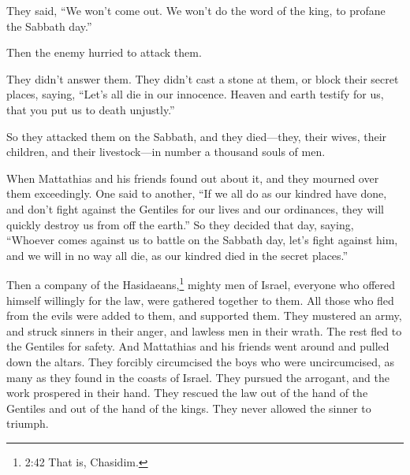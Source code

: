  They said, ``We won't come out. We won't do the word of
the king, to profane the Sabbath day.''

 Then the enemy hurried to attack them.

 They didn't answer them. They didn't cast a stone at them,
or block their secret places,  saying, ``Let's all die in
our innocence. Heaven and earth testify for us, that you put us to death
unjustly.''

 So they attacked them on the Sabbath, and they
died---they, their wives, their children, and their livestock---in
number a thousand souls of men.

 When Mattathias and his friends found out about it, and
they mourned over them exceedingly.  One said to another,
``If we all do as our kindred have done, and don't fight against the
Gentiles for our lives and our ordinances, they will quickly destroy us
from off the earth.''  So they decided that day, saying,
``Whoever comes against us to battle on the Sabbath day, let's fight
against him, and we will in no way all die, as our kindred died in the
secret places.''

 Then a company of the Hasidaeans,\footnote{2:42 That is,
  Chasidim.} mighty men of Israel, everyone who offered himself
willingly for the law, were gathered together to them.  All
those who fled from the evils were added to them, and supported them.
 They mustered an army, and struck sinners in their anger,
and lawless men in their wrath. The rest fled to the Gentiles for
safety.  And Mattathias and his friends went around and
pulled down the altars.  They forcibly circumcised the boys
who were uncircumcised, as many as they found in the coasts of Israel.
 They pursued the arrogant, and the work prospered in their
hand.  They rescued the law out of the hand of the Gentiles
and out of the hand of the kings. They never allowed the sinner to
triumph.

